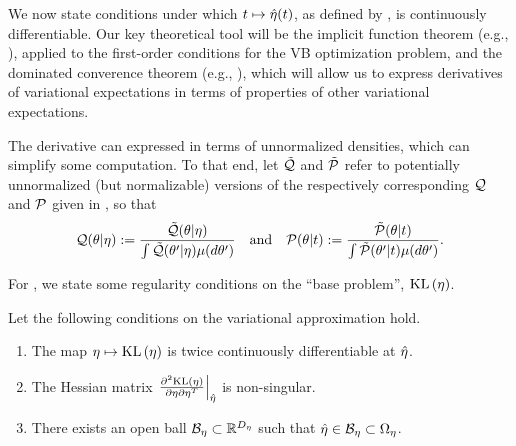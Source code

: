 We now state conditions under which $t \mapsto \hat\eta(t)$, as defined by
, is continuously differentiable.  Our key theoretical tool will
be the implicit function theorem (e.g., \citet{krantz:2012:implicit}), applied
to the first-order conditions for the VB optimization problem, and the dominated
converence theorem (e.g., \citet[Theorem 16.8]{billingsley:1986:probability}),
which will allow us to express derivatives of variational expectations in terms
of properties  of other variational expectations.

The derivative can expressed in terms of unnormalized densities, which can
simplify some computation.  To that end, let $\tilde{\mathcal{Q}}$ and $\tilde{\mathcal{P}}$ refer to
potentially unnormalized (but normalizable) versions of the respectively
corresponding $\mathcal{Q}$ and $\mathcal{P}$ given in , so that
%
\begin{align*}
%
\q(\theta \vert \eta) :={}
    \frac{\qtil(\theta \vert \eta)}
    {\int \qtil(\theta' \vert \eta) \mu(d\theta')} \mathand
\p(\theta \vert \t) :={}
    \frac{\ptil(\theta \vert \t)}
    {\int \ptil(\theta' \vert \t) \mu(d\theta')}.
%
\end{align*}

For , we state some regularity conditions on the ``base
problem'', $\mathrm{KL}\left(\eta\right)$.

\begin{assu}
%
Let the following conditions on the variational approximation hold.
%
\begin{enumerate}
%
    \item {} The map $\eta \mapsto \mathrm{KL}\left(\eta\right)$ is twice
    continuously differentiable at $\hat\eta$.

    \item{} The Hessian matrix $\left.\frac{\partial^2 \mathrm{KL}\left(\eta\right)}{\partial \eta \partial \eta^T}\right\vert_{\hat\eta}$ is non-singular.

    \item {} There exists an open ball $\mathcal{B}_\eta
    \subset \mathbb{R}^{D_{\eta}}$ such that $\hat\eta \in \mathcal{B}_\eta \subset
    \Omega_{\eta}$.
%
\end{enumerate}
%
\end{assu}

